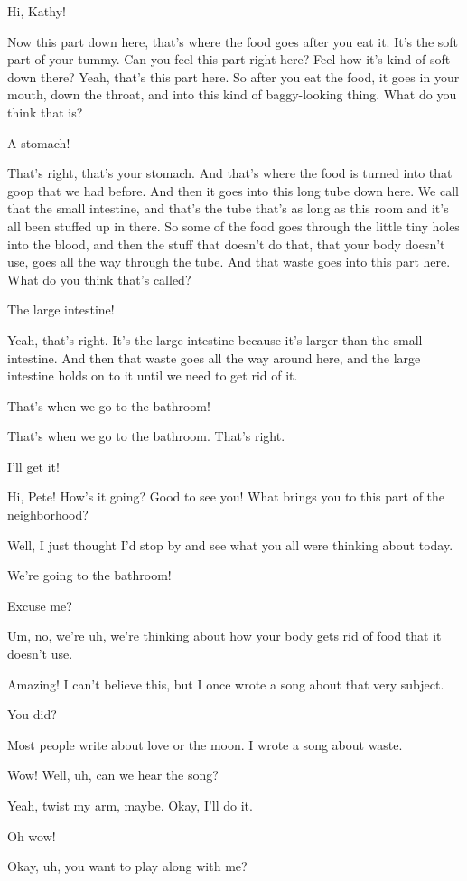 Hi, Kathy!

Now this part down here, that's where the food goes after you eat it. It's the soft part of your tummy. Can you feel this part right here? Feel how it's kind of soft down there? Yeah, that's this part here. So after you eat the food, it goes in your mouth, down the throat, and into this kind of baggy-looking thing. What do you think that is?

A stomach!

That's right, that's your stomach. And that's where the food is turned into that goop that we had before. And then it goes into this long tube down here. We call that the small intestine, and that's the tube that's as long as this room and it's all been stuffed up in there. So some of the food goes through the little tiny holes into the blood, and then the stuff that doesn't do that, that your body doesn't use, goes all the way through the tube. And that waste goes into this part here. What do you think that's called?

The large intestine!

Yeah, that's right. It's the large intestine because it's larger than the small intestine. And then that waste goes all the way around here, and the large intestine holds on to it until we need to get rid of it.

That's when we go to the bathroom!

That's when we go to the bathroom. That's right.

I'll get it!

Hi, Pete! How's it going? Good to see you! What brings you to this part of the neighborhood?

Well, I just thought I'd stop by and see what you all were thinking about today.

We're going to the bathroom!

Excuse me?

Um, no, we're uh, we're thinking about how your body gets rid of food that it doesn't use.

Amazing! I can't believe this, but I once wrote a song about that very subject.

You did?

Most people write about love or the moon. I wrote a song about waste.

Wow! Well, uh, can we hear the song?

Yeah, twist my arm, maybe. Okay, I'll do it.

Oh wow!

Okay, uh, you want to play along with me?

